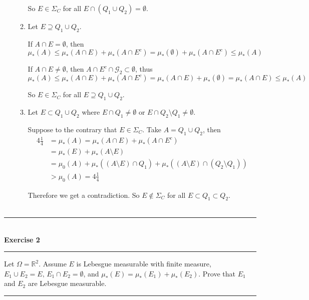 \documentclass[a4paper,11pt]{article}
\begin{document}
\begin{enumerate}
\begin{enumerate}
		So $E \in \Sigma_C$ for all $E \cap (Q_1 \cup Q_2) = \emptyset$.\\

		\item Let $E \supseteq Q_1 \cup Q_2$.

		If $A \cap E = \emptyset$, then
			$$\mu_*(A)
			\leq \mu_*(A \cap E) + \mu_*(A \cap E^c)
			= \mu_*(\emptyset) + \mu_*(A \cap E^c)
			\leq \mu_*(A)$$

		If $A \cap E \neq \emptyset$, then $A \cap E^c \cap \mathcal{G}_2 \subset \emptyset$, thus
			$$\mu_*(A)
			\leq \mu_*(A \cap E) + \mu_*(A \cap E^c)
			= \mu_*(A \cap E) + \mu_*(\emptyset)
			= \mu_*(A \cap E)
			\leq \mu_*(A)$$

		So $E \in \Sigma_C$ for all $E \supseteq Q_1 \cup Q_2$.\\

		\item Let $E \subset Q_1 \cup Q_2$ where $E \cap Q_1 \neq \emptyset$ or $E \cap Q_2 \setminus Q_1 \neq \emptyset$.

		Suppose to the contrary that $E \in \Sigma_C$. Take $A = Q_1 \cup Q_2$, then
			$$\begin{aligned}
			4\frac{1}{4}
			&= \mu_*(A)
			= \mu_*(A \cap E) + \mu_*(A \cap E^c)\\
			&= \mu_*(E) + \mu_*(A \setminus E)\\
			&= \mu_0(A) + \mu_*((A \setminus E) \cap Q_1) + \mu_*((A \setminus E) \cap (Q_2 \setminus Q_1))\\
			&> \mu_0(A)
			= 4\frac{1}{4}
			\end{aligned}$$

		Therefore we get a contradiction. So $E \notin \Sigma_C$ for all $E \subset Q_1 \subset Q_2$.\\\\
	\end{enumerate}
\end{enumerate}



\begin{flushleft}
	\rule[-0.5ex]{17cm}{2pt}\\
		\textbf{Exercise 2}\\
	\rule[1.5ex]{17cm}{0.5pt}
		Let $\Omega = \mathbb{R}^2$. Assume $E$ is Lebesgue measurable with finite measure, $E_1 \cup E_2 = E,\, E_1 \cap E_2 = \emptyset$, and $\mu_*(E) = \mu_*(E_1) + \mu_*(E_2)$. Prove that $E_1$ and $E_2$ are Lebesgue measurable.
	\rule[1.0ex]{17cm}{0.5pt}\
\end{flushleft}
\end{document}

